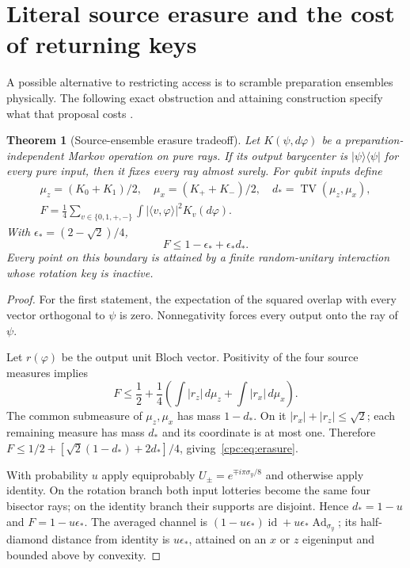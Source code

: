 \documentclass[11pt,oneside,openany]{book}
\newtheorem{theorem}{Theorem}[chapter]
\theoremstyle{definition}
\theoremstyle{remark}\newtheorem{remark}[theorem]{Remark}
\begin{document}
\section{Literal source erasure and the cost of returning keys}

A possible alternative to restricting access is to scramble preparation ensembles physically. The following exact obstruction and attaining construction specify what that proposal costs \cite{M14}.

\begin{theorem}[Source-ensemble erasure tradeoff]
\label{cpc:thm:erasure}
Let $K(\psi,d\varphi)$ be a preparation-independent Markov operation on pure rays. If its output barycenter is $|\psi\rangle\langle\psi|$ for every pure input, then it fixes every ray almost surely. For qubit inputs define
\[
 \begin{gathered}
 \mu_z=(K_0+K_1)/2,\quad\mu_x=(K_++K_-)/2,\quad
 d_*=\operatorname{TV}(\mu_z,\mu_x),\\
 F=\frac14\sum_{v\in\{0,1,+,-\}}\int|\langle v,\varphi\rangle|^2K_v(d\varphi).
\end{gathered}
\]
With $\epsilon_*=(2-\sqrt2)/4$,
\begin{equation}
 F\le1-\epsilon_*+\epsilon_*d_*.
 \label{cpc:eq:erasure}
\end{equation}
Every point on this boundary is attained by a finite random-unitary interaction whose rotation key is inactive.
\end{theorem}
\begin{proof}
For the first statement, the expectation of the squared overlap with every vector orthogonal to $\psi$ is zero. Nonnegativity forces every output onto the ray of $\psi$.

Let $r(\varphi)$ be the output unit Bloch vector. Positivity of the four source measures implies
\[
 F\le\frac12+\frac14\left(\int|r_z|\,d\mu_z+\int|r_x|\,d\mu_x\right).
\]
The common submeasure of $\mu_z,\mu_x$ has mass $1-d_*$. On it $|r_x|+|r_z|\le\sqrt2$; each remaining measure has mass $d_*$ and its coordinate is at most one. Therefore
$F\le1/2+[\sqrt2(1-d_*)+2d_*]/4$, giving~\eqref{cpc:eq:erasure}.

With probability $u$ apply equiprobably $U_\pm=e^{\mp i\pi\sigma_y/8}$ and otherwise apply identity. On the rotation branch both input lotteries become the same four bisector rays; on the identity branch their supports are disjoint. Hence $d_*=1-u$ and $F=1-u\epsilon_*$. The averaged channel is $(1-u\epsilon_*)\operatorname{id}+u\epsilon_*\operatorname{Ad}_{\sigma_y}$; its half-diamond distance from identity is $u\epsilon_*$, attained on an $x$ or $z$ eigeninput and bounded above by convexity.
\end{proof}
\end{document}
